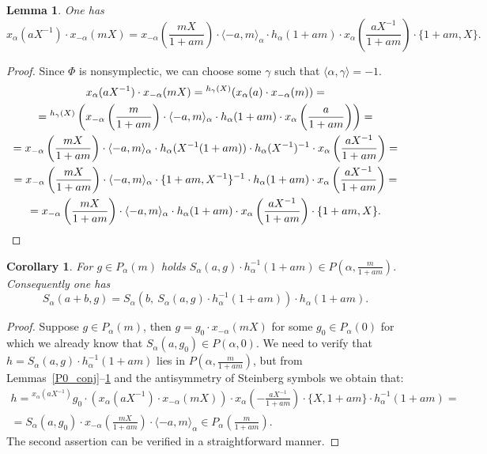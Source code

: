 \documentclass[oneside, 8pt]{amsart}
\newtheorem{corollary}{Corollary}
\newtheorem{lemma}{Lemma}
\theoremstyle{remark}
\theoremstyle{definition}
\numberwithin{equation}{section}
\begin{document}
\begin{lemma} \label{lem:Tulenbayev-formula} One has
 \[x_\alpha(aX^{-1}) \cdot x_{-\alpha}(mX) = x_{-\alpha}\left(\frac{mX}{1+am}\right) \cdot \langle -a, m\rangle_\alpha \cdot h_\alpha(1+am) \cdot 
 x_{\alpha}\left(\frac{aX^{-1}}{1+am}\right) \cdot \{1+am, X\}.\] \end{lemma}
\begin{proof} Since $\Phi$ is nonsymplectic, we can choose some $\gamma$ such that $\langle \alpha, \gamma \rangle = -1$.
 \begin{multline*}
 x_\alpha(aX^{-1}) \cdot x_{-\alpha}(mX) %
 = {}^{h_\gamma(X)}(x_\alpha(a) \cdot x_{-\alpha}(m)) = \\
 = {}^{h_\gamma(X)}\left( x_{-\alpha}\left(\frac{m}{1+am}\right) \cdot \langle -a, m\rangle_\alpha \cdot h_\alpha(1+am) \cdot x_\alpha\left(\frac{a}{1+am}\right) \right) = \\
 = x_{-\alpha}\left(\frac{mX}{1+am}\right) \cdot \langle -a, m\rangle_\alpha \cdot h_\alpha(X^{-1}(1+am))\cdot h_\alpha(X^{-1})^{-1} \cdot x_{\alpha}\left(\frac{aX^{-1}}{1+am}\right) = \\
 = x_{-\alpha}\left(\frac{mX}{1+am}\right) \cdot \langle -a, m\rangle_\alpha \cdot \{1+am, X^{-1}\}^{-1} \cdot h_\alpha(1+am)\cdot x_{\alpha}\left(\frac{aX^{-1}}{1+am}\right) = \\
 = x_{-\alpha}\left(\frac{mX}{1+am}\right) \cdot \langle -a, m\rangle_\alpha \cdot h_\alpha(1+am) \cdot x_{\alpha}\left(\frac{aX^{-1}}{1+am}\right) \cdot \{1+am, X\}. \qedhere
\end{multline*}
\end{proof}

\begin{corollary} For $g \in P_\alpha(m)$ holds $S_\alpha(a, g) \cdot h_\alpha^{-1}(1 + am) \in P(\alpha, \frac{m}{1 + am})$.
Consequently one has \[ S_\alpha(a+b, g) = S_\alpha\left(b,\ S_\alpha(a, g) \cdot h_\alpha^{-1}(1 + am)\right)\cdot h_\alpha(1+am). \]\end{corollary}
\begin{proof}
Suppose $g \in P_\alpha(m)$, then $g = g_0 \cdot x_{-\alpha}(mX)$ for some $g_0 \in P_\alpha(0)$ for which we already know that $S_\alpha(a, g_0) \in P(\alpha, 0)$.
We need to verify that $h = S_\alpha(a, g) \cdot h_\alpha^{-1}(1 + am)$ lies in $P\left(\alpha, \frac{m}{1 + am}\right)$, but from Lemmas~\ref{P0_conj}--\ref{lem:Tulenbayev-formula} and the antisymmetry of Steinberg symbols we obtain that:
\begin{multline} \nonumber h = {}^{x_\alpha(aX^{-1})}\!g_0 \cdot \left(x_{\alpha}(aX^{-1}) \cdot x_{-\alpha}(mX)\right) \cdot x_{\alpha}\left(-\frac{aX^{-1}}{1+am}\right) \cdot \{X, 1+am\} \cdot h_\alpha^{-1}(1 + am) = \\
= S_\alpha(a, g_0) \cdot x_{-\alpha}\left(\frac{mX}{1+am}\right) \cdot \langle -a, m\rangle_\alpha \in P_\alpha\left(\frac{m}{1+am}\right). \end{multline}
The second assertion can be verified in a straightforward manner. \end{proof}
\end{document}
